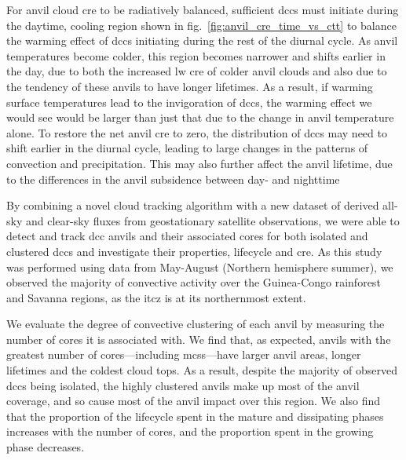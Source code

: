 \documentclass[acp, manuscript]{copernicus}
\begin{document}
For anvil cloud \acrshort{cre} to be radiatively balanced, sufficient \acrshort{dcc}s must initiate during the daytime, cooling region shown in fig.~\ref{fig:anvil_cre_time_vs_ctt} to balance the warming effect of \acrshort{dcc}s initiating during the rest of the diurnal cycle. 
As anvil temperatures become colder, this region becomes narrower and shifts earlier in the day, due to both the increased \acrshort{lw} \acrshort{cre} of colder anvil clouds and also due to the tendency of these anvils to have longer lifetimes. 
As a result, if warming surface temperatures lead to the invigoration of \acrshort{dcc}s, the warming effect we would see would be larger than just that due to the change in anvil temperature alone. 
To restore the net anvil \acrshort{cre} to zero, the distribution of \acrshort{dcc}s may need to shift earlier in the diurnal cycle, leading to large changes in the patterns of convection and precipitation. 
This may also further affect the anvil lifetime, due to the differences in the anvil subsidence between day- and nighttime \citep{sokol_tropical_2020}



\conclusions  %

By combining a novel cloud tracking algorithm with a new dataset of derived all-sky and clear-sky fluxes from geostationary satellite observations, we were able to detect and track \acrshort{dcc} anvils and their associated cores for both isolated and clustered \acrshort{dcc}s and investigate their properties, lifecycle and \acrshort{cre}. 
As this study was performed using data from May-August (Northern hemisphere summer), we observed the majority of convective activity over the Guinea-Congo rainforest and Savanna regions, as the \acrshort{itcz} is at its northernmost extent.

We evaluate the degree of convective clustering of each anvil by measuring the number of cores it is associated with. 
We find that, as expected, anvils with the greatest number of cores---including \acrshort{mcs}s---have larger anvil areas, longer lifetimes and the coldest cloud tops. 
As a result, despite the majority of observed \acrshort{dcc}s being isolated, the highly clustered anvils make up most of the anvil coverage, and so cause most of the anvil impact over this region. 
We also find that the proportion of the lifecycle spent in the mature and dissipating phases increases with the number of cores, and the proportion spent in the growing phase decreases.
\end{document}
